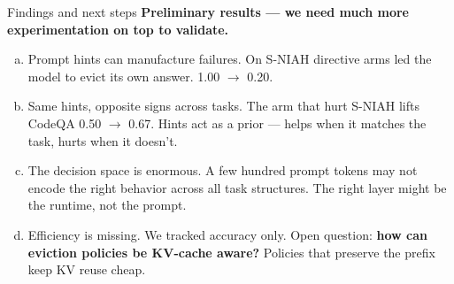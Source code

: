 \documentclass[aspectratio=169,10pt]{beamer}
\begin{document}
\begin{frame}{Findings and next steps}
\textbf{Preliminary results --- we need much more experimentation on top to validate.}
\vspace{0.6em}
\begin{enumerate}[(a)]\setlength{\itemsep}{0.5em}
  \item \alert{Prompt hints can manufacture failures.}
        On S-NIAH directive arms led the model to evict its own answer.
        1.00 $\to$ 0.20.
  \item \alert{Same hints, opposite signs across tasks.}
        The arm that hurt S-NIAH lifts CodeQA 0.50 $\to$ 0.67. Hints act
        as a prior --- helps when it matches the task, hurts when it doesn't.
  \item \alert{The decision space is enormous.} A few hundred prompt tokens
        may not encode the right behavior across all task structures. The
        right layer might be the runtime, not the prompt.
  \item \alert{Efficiency is missing.} We tracked accuracy only. Open question:
        \textbf{how can eviction policies be KV-cache aware?} Policies that
        preserve the prefix keep KV reuse cheap.
\end{enumerate}

\end{frame}
\end{document}

